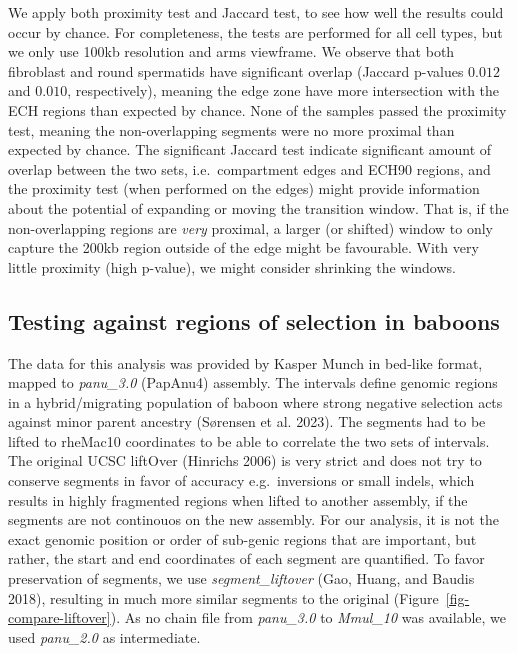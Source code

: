 \documentclass[
  11pt,
  a4paper,
]{scrbook}
\let\oldemph\emph
\renewcommand\emph[1]{\oldemph{\color{gray}#1}}
\begin{document}
We apply both proximity test and Jaccard test, to see how well the
results could occur by chance. For completeness, the tests are performed
for all cell types, but we only use 100kb resolution and arms viewframe.
We observe that both fibroblast and round spermatids have significant
overlap (Jaccard p-values \(0.012\) and \(0.010\), respectively),
meaning the edge zone have more intersection with the ECH regions than
expected by chance. None of the samples passed the proximity test,
meaning the non-overlapping segments were no more proximal than expected
by chance. The significant Jaccard test indicate significant amount of
overlap between the two sets, i.e.~compartment edges and ECH90 regions,
and the proximity test (when performed on the edges) might provide
information about the potential of expanding or moving the transition
window. That is, if the non-overlapping regions are \emph{very}
proximal, a larger (or shifted) window to only capture the 200kb region
outside of the edge might be favourable. With very little proximity
(high p-value), we might consider shrinking the windows.

\subsection{Testing against regions of selection in
baboons}\label{testing-against-regions-of-selection-in-baboons}

The data for this analysis was provided by Kasper Munch in bed-like
format, mapped to \emph{panu\_3.0} (PapAnu4) assembly. The intervals
define genomic regions in a hybrid/migrating population of baboon where
strong negative selection acts against minor parent ancestry (Sørensen
et al. 2023). The segments had to be lifted to rheMac10 coordinates to
be able to correlate the two sets of intervals. The original UCSC
liftOver (Hinrichs 2006) is very strict and does not try to conserve
segments in favor of accuracy e.g.~inversions or small indels, which
results in highly fragmented regions when lifted to another assembly, if
the segments are not continouos on the new assembly. For our analysis,
it is not the exact genomic position or order of sub-genic regions that
are important, but rather, the start and end coordinates of each segment
are quantified. To favor preservation of segments, we use
\emph{segment\_liftover} (Gao, Huang, and Baudis 2018), resulting in
much more similar segments to the original
(Figure~\ref{fig-compare-liftover}). As no chain file from
\emph{panu\_3.0} to \emph{Mmul\_10} was available, we used
\emph{panu\_2.0} as intermediate.
\end{document}
